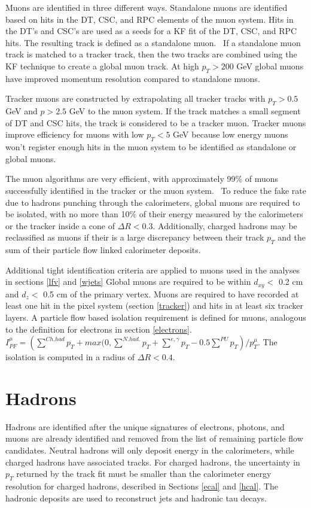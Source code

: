 \documentclass[oneside, letterpaper, oldfontcommands]{memoir}
\begin{document}
\qquad Muons are identified in three different ways. Standalone muons are identified based on hits in the DT, CSC, and RPC elements of the muon system. Hits in the DT's and CSC's are used as a seeds for a KF fit of the DT, CSC, and RPC hits. The resulting track is defined as a standalone muon.~\cite{Chatrchyan:2013sba} If a standalone muon track is matched to a tracker track, then the two tracks are combined using the KF technique to create a global muon track. At high $p_{T} > 200$ GeV global muons have improved momentum resolution compared to standalone muons.

\qquad Tracker muons are constructed by extrapolating all tracker tracks with $p_{T} > 0.5$ GeV and $p > 2.5$ GeV to the muon system. If the track matches a small segment of DT and CSC hits, the track is considered to be a tracker muon. Tracker muons improve efficiency for muons with low $p_{T} < 5$ GeV because low energy muons won't register enough hits in the muon system to be identified as standalone or global muons.

\qquad The muon algorithms are very efficient, with approximately 99$\%$ of muons successfully identified in the tracker or the muon system.~\cite{Chatrchyan:2013sba} To reduce the fake rate due to hadrons punching through the calorimeters, global muons are required to be isolated, with no more than 10$\%$ of their energy measured by the calorimeters or the tracker inside a cone of $\Delta R < 0.3$. Additionally, charged hadrons may be reclassified as muons if their is a large discrepancy between their track $p_{T}$ and the sum of their particle flow linked calorimeter deposits. 

\qquad Additional tight identification criteria are applied to muons used in the analyses in sections \ref{lfv} and \ref{wjets} Global muons are required to be within $d_{xy} <$ 0.2 cm and $d_{z} <$ 0.5 cm of the primary vertex. Muons are required to have recorded at least one hit in the pixel system (section \ref{tracker}) and hits in at least six tracker layers. A particle flow based isolation requirement is defined for muons, analogous to the definition for electrons in section \ref{electrons}. 
$I_{PF}^{\mu} = \left(\sum\limits^{Ch. had} p_{T} + max(0, \sum\limits^{N. had.} p_{T} + \sum\limits^{e,\gamma} p_{T} - 0.5 \sum\limits^{PU} p_{T}\right)/p_{T}^{\mu}$. The isolation is computed in a radius of $\Delta R < 0.4$. 


\section{Hadrons}\label{hadrons}
Hadrons are identified after the unique signatures of electrons, photons, and muons are already identified and removed from the list of remaining particle flow candidates. Neutral hadrons will only deposit energy in the calorimeters, while charged hadrons have associated tracks. For charged hadrons, the uncertainty in $p_{T}$ returned by the track fit must be smaller than the calorimeter energy resolution for charged hadrons, described in Sections \ref{ecal} and \ref{hcal}. The hadronic deposits are used to reconstruct jets and hadronic tau decays.
\end{document}
